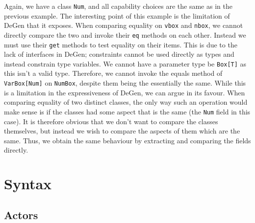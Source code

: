 Again, we have a class \texttt{Num}, and all capability choices are the same as in the previous example. The interesting point of this example is the limitation of DeGen that it exposes. When comparing equality on \texttt{vbox} and \texttt{nbox}, we cannot directly compare the two and invoke their \texttt{eq} methods on each other. Instead we must use their \texttt{get} methods to test equality on their items. This is due to the lack of interfaces in DeGen; constraints cannot be used directly as types and instead constrain type variables. We cannot have a parameter type be \texttt{Box[T]} as this isn't a valid type. Therefore, we cannot invoke the equals method of \texttt{VarBox[Num]} on \texttt{NumBox}, despite them being the essentially the same. While this is a limitation in the expressiveness of DeGen, we can argue in its favour. When comparing equality of two distinct classes, the only way such an operation would make sense is if the classes had some aspect that is the same (the \texttt{Num} field in this case). It is therefore obvious that we don't want to compare the classes themselves, but instead we wish to compare the aspects of them which are the same. Thus, we obtain the same behaviour by extracting and comparing the fields directly. \\

\newpage

\section{Syntax}

\subsection{Actors}

